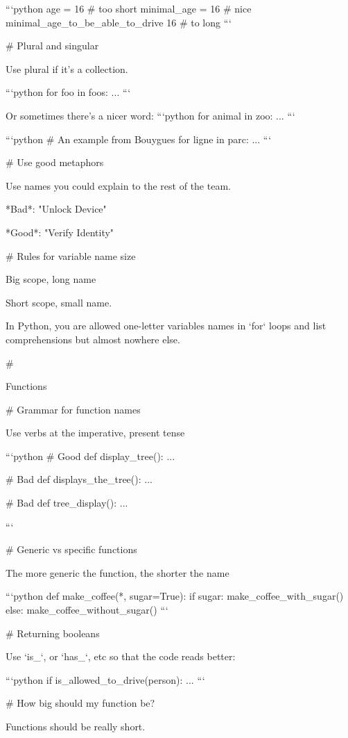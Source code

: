 \vfill

```python
age = 16  # too short
minimal_age = 16 # nice
minimal_age_to_be_able_to_drive  16  # to long
```

# Plural and singular

Use plural if it's a collection.

```python
for foo in foos:
    ...
```

Or sometimes there's a nicer word:
```python
for animal in zoo:
    ...
```

```python
# An example from Bouygues
for ligne in parc:
  ...
```

# Use good metaphors

Use names you could explain to the rest of the team.

\vfill

*Bad*: "Unlock Device"

*Good*: "Verify Identity"

# Rules for variable name size

Big scope, long name

Short scope, small name.

In Python, you are allowed one-letter variables names in `for` loops
and list comprehensions but almost nowhere else.

#

\huge \center Functions


# Grammar for function names

Use verbs at the imperative, present tense

```python
# Good
def display_tree():
    ...

# Bad
def displays_the_tree():
    ...

# Bad
def tree_display():
    ...

```

# Generic vs specific functions

The more generic the function, the shorter the name

```python
def make_coffee(*, sugar=True):
    if sugar:
        make_coffee_with_sugar()
   else:
        make_coffee_without_sugar()
```



# Returning booleans

Use `is_`, or `has_`, etc so that the code reads better:

```python
if is_allowed_to_drive(person):
    ...
```

# How big should my function be?

Functions should be really short.

